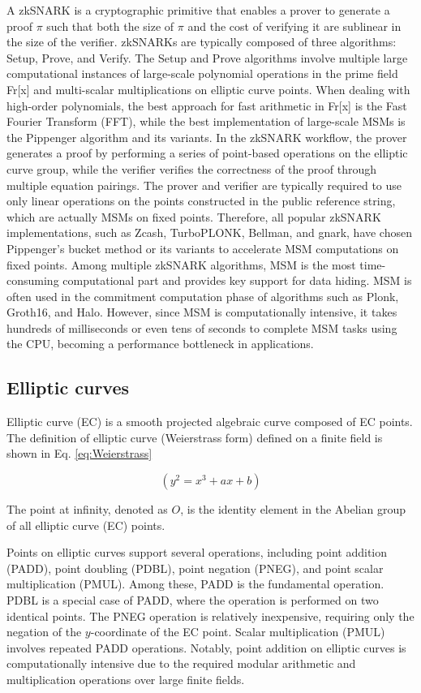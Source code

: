 \documentclass[conference]{IEEEtran}
\begin{document}
A zkSNARK is a cryptographic primitive that enables a prover to generate a proof $\pi$ such that both the size of $\pi$ and the cost of verifying it are sublinear in the size of the verifier. zkSNARKs are typically composed of three algorithms: Setup, Prove, and Verify. The Setup and Prove algorithms involve multiple large computational instances of large-scale polynomial operations in the prime field Fr[x] and multi-scalar multiplications on elliptic curve points. When dealing with high-order polynomials, the best approach for fast arithmetic in Fr[x] is the Fast Fourier Transform (FFT), while the best implementation of large-scale MSMs is the Pippenger algorithm and its variants. In the zkSNARK workflow, the prover generates a proof by performing a series of point-based operations on the elliptic curve group, while the verifier verifies the correctness of the proof through multiple equation pairings. The prover and verifier are typically required to use only linear operations on the points constructed in the public reference string, which are actually MSMs on fixed points. Therefore, all popular zkSNARK implementations, such as Zcash, TurboPLONK, Bellman, and gnark, have chosen Pippenger's bucket method or its variants to accelerate MSM computations on fixed points. Among multiple zkSNARK algorithms, MSM is the most time-consuming computational part and provides key support for data hiding. MSM is often used in the commitment computation phase of algorithms such as Plonk, Groth16, and Halo. However, since MSM is computationally intensive, it takes hundreds of milliseconds or even tens of seconds to complete MSM tasks using the CPU, becoming a performance bottleneck in applications.

\subsection{Elliptic curves}
Elliptic curve (EC) is a smooth projected algebraic curve composed of EC points. The definition of elliptic curve (Weierstrass form) defined on a finite field is shown in Eq. \eqref{eq:Weierstrass}

\begin{equation}
(y^2=x^3+ax+b)
\label{eq:Weierstrass}
\end{equation}

The point at infinity, denoted as \( O \), is the identity element in the Abelian group of all elliptic curve (EC) points.

Points on elliptic curves support several operations, including point addition (PADD), point doubling (PDBL), point negation (PNEG), and point scalar multiplication (PMUL). Among these, PADD is the fundamental operation. PDBL is a special case of PADD, where the operation is performed on two identical points. The PNEG operation is relatively inexpensive, requiring only the negation of the \( y \)-coordinate of the EC point. Scalar multiplication (PMUL) involves repeated PADD operations. Notably, point addition on elliptic curves is computationally intensive due to the required modular arithmetic and multiplication operations over large finite fields.
\end{document}
